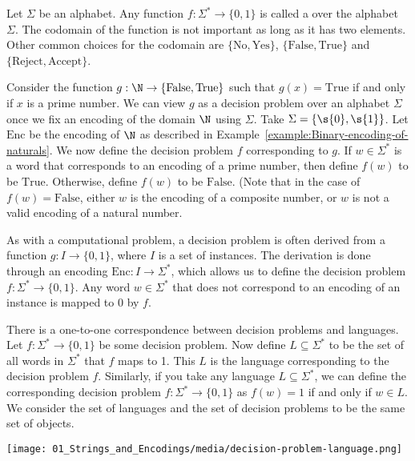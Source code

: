 \begin{definition} \label{definition:Decision-problem}
Let $\Sigma$ be an alphabet. Any function $f: \Sigma^* \to \{0,1\}$ is called a  over the alphabet $\Sigma$. 
The codomain of the function is not important as long as it has two elements. 
Other common choices for the codomain are $\{\text{No}, \text{Yes}\}$, $\{\text{False}, \text{True}\}$ and $\{ \text{Reject}, \text{Accept}\}$.
\end{definition}

\begin{example} \label{example:Primality-testing-as-a-decision-problem}
Consider the function $g:\N \to \{\text{False}, \text{True}\}$ such that $g(x) = \text{True}$ if and only if $x$ is a prime number.
We can view $g$ as a decision problem over an alphabet $\Sigma$ once we fix an encoding of the domain $\N$ using $\Sigma$. 
Take $\Sigma = \{\s{0},\s{1}\}$. 
Let $\text{Enc}$ be the encoding of $\N$ as described in Example~\ref{example:Binary-encoding-of-naturals}. 
We now define the decision problem $f$ corresponding to $g$. 
If $w \in \Sigma^*$ is a word that corresponds to an encoding of a prime number, then define $f(w)$ to be $\text{True}$. Otherwise, define $f(w)$ to be $\text{False}$. (Note that in the case of $f(w) = \text{False}$, either $w$ is the encoding of a composite number, or $w$ is not a valid encoding of a natural number.
\end{example}

\begin{note} \label{note:Decision-problem-as-mapping-instances-to-0-or-1s}
As with a computational problem, a decision problem is often derived from a function $g: I \to \{0,1\}$, where $I$ is a set of instances. 
The derivation is done through an encoding $\text{Enc}: I \to \Sigma^*$, which allows us to define the decision problem $f: \Sigma^* \to \{0,1\}$. Any word $w \in \Sigma^*$ that does not correspond to an encoding of an instance is mapped to $0$ by $f$.
\end{note}

\begin{important} \label{important:Correspondence-between-decision-problems-and-languages}
There is a one-to-one correspondence between decision problems and languages. Let $f:\Sigma^* \to \{0,1\}$ be some decision problem. Now define $L \subseteq \Sigma^*$ to be the set of all words in $\Sigma^*$ that $f$ maps to 1. This $L$ is the language corresponding to the decision problem $f$. Similarly, if you take any language $L \subseteq \Sigma^*$, we can define the corresponding decision problem $f:\Sigma^* \to \{0,1\}$ as $f(w) = 1$ if and only if $w \in L$. We consider the set of languages and the set of decision problems to be the same set of objects.
\begin{center}
    \texttt{[image: 01\_Strings\_and\_Encodings/media/decision-problem-language.png]}
\end{center}
\end{important}